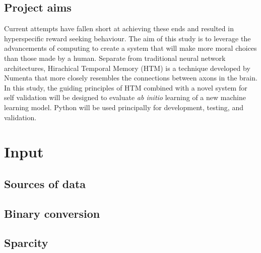 \documentclass{book}
\begin{document}
\section{Project aims}
Current attempts have fallen short at achieving these ends and resulted in hyperspecific reward seeking behaviour.
The aim of this study is to leverage the advancements of computing to create a system that will make more moral choices than those made by a human.
Separate from traditional neural network architectures, Hirachical Temporal Memory (HTM) is a technique developed by Numenta that more closely resembles the connections between axons in the brain.
In this study, the guiding principles of HTM combined with a novel system for self validation will be designed to evaluate \emph{ab initio} learning of a new machine learning model.
Python will be used principally for development, testing, and validation.

\chapter{Input}
\section{Sources of data}

\section{Binary conversion}

\section{Sparcity}
\end{document}

